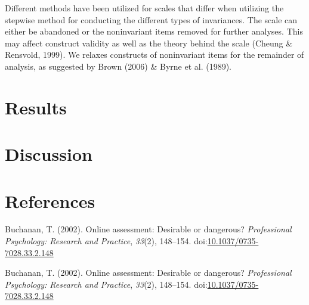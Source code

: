 \documentclass[man,draftall]{apa6}
\begin{document}
Different methods have been utilized for scales that differ when utilizing the stepwise method for conducting the different types of invariances. The scale can either be abandoned or the noninvariant items removed for further analyses. This may affect construct validity as well as the theory behind the scale (Cheung \& Rensvold, 1999). We relaxes constructs of noninvariant items for the remainder of analysis, as suggested by Brown (2006) \& Byrne et al. (1989).

\hypertarget{results}{%
\section{Results}\label{results}}

\hypertarget{discussion}{%
\section{Discussion}\label{discussion}}

\newpage

\hypertarget{references}{%
\section{References}\label{references}}

\begingroup
\setlength{\parindent}{-0.5in}
\setlength{\leftskip}{0.5in}

\hypertarget{refs}{}
\leavevmode\hypertarget{ref-Buchanan2002}{}%
Buchanan, T. (2002). Online assessment: Desirable or dangerous? \emph{Professional Psychology: Research and Practice}, \emph{33}(2), 148--154. doi:\href{https://doi.org/10.1037/0735-7028.33.2.148}{10.1037/0735-7028.33.2.148}

\leavevmode\hypertarget{ref-Buchanan2002}{}%
Buchanan, T. (2002). Online assessment: Desirable or dangerous? \emph{Professional Psychology: Research and Practice}, \emph{33}(2), 148--154. doi:\href{https://doi.org/10.1037/0735-7028.33.2.148}{10.1037/0735-7028.33.2.148}

\endgroup
\end{document}
